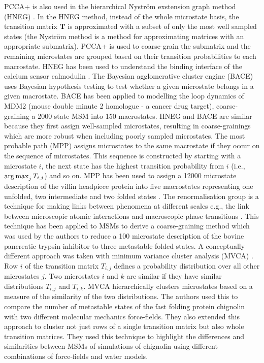 PCCA+ is also used in the hierarchical Nystr{\"o}m exstension graph method (HNEG) \cite{yaoHierarchicalNystromMethods2013a}.  In the HNEG method, instead of the whole microstate basis, the transition matrix $\mathbf{T}$ is approximated with a subset of only the most well sampled states (the  Nystr{\"o}m  method is a method for approximating matrices with an appropriate submatrix). PCCA+ is used to coarse-grain the submatrix and the remaining microstates are grouped based on their transition probabilities to each macrostate.  HNEG  has been used to understand the binding interface of the calcium sensor calmodulin \cite{shuklaConformationalHeterogeneityCalmodulin2016}. The Bayesian agglomerative cluster engine (BACE) \cite{bowmanImprovedCoarsegrainingMarkov2012a} uses Bayesian hypothesis testing to test whether a given microstate belongs in a given macrostate. BACE has been applied to modelling the loop dynamics of MDM2 (mouse double minute 2 homologue - a cancer drug target), coarse-graining a 2000 state MSM into 150 macrostates.  HNEG and BACE are similar because they first assign well-sampled microstates, resulting in coarse-grainings which are more robust when including poorly sampled microstates.  The most probable path (MPP) \cite{jainIdentifyingMetastableStates2012a}  assigns microstates to the same macrostate if they occur on the sequence of microstates. This sequence is constructed by starting with a microstate $i$, the next state has the highest transition probability from $i$ (i.e., $\operatorname*{arg\,max}_{j} T_{i,j}$) and so on. MPP has been used to assign a 12000 microstate description of the villin headpiece protein into five macrostates representing one unfolded, two intermediate and two folded states \cite{jainHierarchicalFoldingFree2014}.  The renormalisation group is a technique for making links between phenomena at different scales e.g., the link between microscopic atomic interactions and macroscopic phase transitions \cite{wilsonRenormalizationGroupCritical1983}. This technique has been applied to MSMs  \cite{orioliDimensionalReductionMarkov2016c} to derive a coarse-graining method which was used by the authors to reduce a 100 microstate description of the bovine  pancreatic  trypsin  inhibitor to three metastable folded states.  A conceptually different approach was taken with minimum variance cluster analysis (MVCA) \cite{husicMinimumVarianceClustering2018}. Row $i$ of the transition matrix $T_{i,j}$ defines a probability distribution over all other microstates $j$. Two microstates $i$ and $k$ are similar if they have similar distributions $T_{i,j}$ and $T_{i,k}$. MVCA hierarchically clusters microstates based on a measure of the similarity of the two distributions. The authors used this to compare the number of metastable states of the fast folding protein chignolin with two different molecular mechanics force-fields. They also extended this approach to cluster not just rows of a single transition matrix but also whole transition matrices. They used this technique to  highlight the differences and similarities between MSMs of simulations of chignolin using different combinations of force-fields and water models. 

